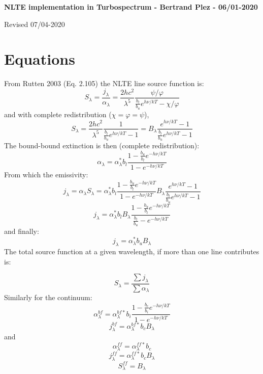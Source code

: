 \documentclass[a4paper,12pt]{article}
\begin{document}
\centerline
{\bf NLTE implementation in Turbospectrum - Bertrand Plez - 06/01-2020}
\centerline {Revised 07/04-2020}
\bigskip

\section{Equations}
\noindent
From Rutten 2003 (Eq. 2.105) the NLTE line source function is:
\begin{equation}
S_\lambda = \frac{j_\lambda}{\alpha_\lambda} = 
\frac{2 h c^2}{\lambda^5} \frac{\psi/\varphi}{\frac{b_l}{b_u}e^{h\nu/kT}-\chi/\varphi} 
\end{equation}
and with complete redistribution ($\chi=\varphi=\psi$),
\begin{equation}
 S_\lambda = \frac{2 h c^2}{\lambda^5} \frac{1}{\frac{b_l}{b_u}e^{h\nu/kT}-1} = B_\lambda \frac{e^{h\nu/kT}-1}{\frac{b_l}{b_u}e^{h\nu/kT}-1}
\end{equation}
The bound-bound extinction is then (complete redistribution):
\begin{equation}
\boxed{\alpha_\lambda = \alpha_\lambda^* b_l \frac{1-\frac{b_u}{b_l}e^{-h\nu/kT}}{1-e^{-h\nu/kT}}}\label{eq-bb}
\end{equation}
From which the emissivity:
\begin{equation}
j_\lambda = \alpha_\lambda S_\lambda = \alpha_\lambda^* b_l \frac{1-\frac{b_u}{b_l}e^{-h\nu/kT}}{1-e^{-h\nu/kT}}
B_\lambda \frac{e^{h\nu/kT}-1}{\frac{b_l}{b_u}e^{h\nu/kT}-1}
\end{equation}
\begin{equation}
j_\lambda = \alpha_\lambda^* b_l B_\lambda \frac{1 - \frac{b_u}{b_l} e^{-h\nu/kT}}{\frac{b_l}{b_u} - e^{-h\nu/kT}}
\end{equation}
and finally: 
\begin{equation}
\boxed{j_\lambda = \alpha_\lambda^* b_u B_\lambda }\label{eq-jbb}
\end{equation}
The total source function at a given wavelength, if more than one line contributes is:

\begin{equation}
\boxed{S_\lambda=\frac{\sum{j_\lambda}}{\sum{\alpha_\lambda}}}\label{eq-Sbb}
\end{equation}
Similarly for the continuum:
\begin{equation}
\boxed{ \alpha_\lambda^{bf} = \alpha_\lambda^{bf*} b_i \frac{1-\frac{b_c}{b_i}e^{-h\nu/kT}}{1-e^{-h\nu/kT}} } \label{eq-bf}
\end{equation}
\begin{equation}
\boxed{j_\lambda^{bf} = \alpha_\lambda^{bf*} b_c B_\lambda }\label{eq-jbf}
\end{equation}
and
\begin{equation}
\boxed{ \alpha_\lambda^{ff} = \alpha_\lambda^{ff*} b_c} \label{eq-ff}
\end{equation}
\begin{equation}
\boxed{j_\lambda^{ff} = \alpha_\lambda^{ff*} b_c B_\lambda }\label{eq-jff}
\end{equation}
\begin{equation}
S_\lambda^{ff}=B_\lambda
\end{equation}
\end{document}
